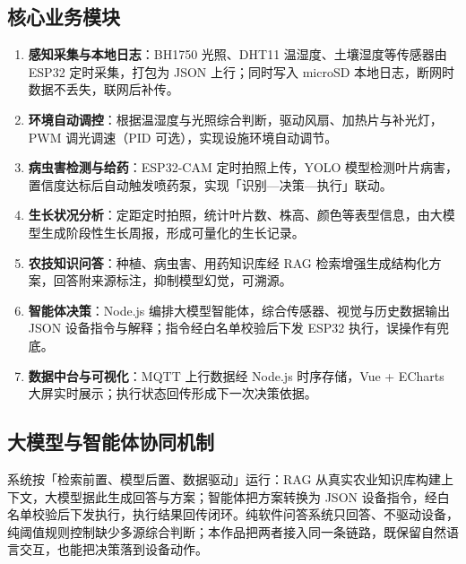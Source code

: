﻿\documentclass[11pt]{ctexart}
\begin{document}
\subsection{核心业务模块}
\begin{enumerate}
  \item \textbf{感知采集与本地日志}：BH1750 光照、DHT11 温湿度、土壤湿度等传感器由 ESP32 定时采集，打包为 JSON 上行；同时写入 microSD 本地日志，断网时数据不丢失，联网后补传。
  \item \textbf{环境自动调控}：根据温湿度与光照综合判断，驱动风扇、加热片与补光灯，PWM 调光调速（PID 可选），实现设施环境自动调节。
  \item \textbf{病虫害检测与给药}：ESP32-CAM 定时拍照上传，YOLO 模型检测叶片病害，置信度达标后自动触发喷药泵，实现「识别—决策—执行」联动。
  \item \textbf{生长状况分析}：定距定时拍照，统计叶片数、株高、颜色等表型信息，由大模型生成阶段性生长周报，形成可量化的生长记录。
  \item \textbf{农技知识问答}：种植、病虫害、用药知识库经 RAG 检索增强生成结构化方案，回答附来源标注，抑制模型幻觉，可溯源。
  \item \textbf{智能体决策}：Node.js 编排大模型智能体，综合传感器、视觉与历史数据输出 JSON 设备指令与解释；指令经白名单校验后下发 ESP32 执行，误操作有兜底。
  \item \textbf{数据中台与可视化}：MQTT 上行数据经 Node.js 时序存储，Vue + ECharts 大屏实时展示；执行状态回传形成下一次决策依据。
\end{enumerate}

\subsection{大模型与智能体协同机制}
系统按「检索前置、模型后置、数据驱动」运行：RAG 从真实农业知识库构建上下文，大模型据此生成回答与方案；智能体把方案转换为 JSON 设备指令，经白名单校验后下发执行，执行结果回传闭环。纯软件问答系统只回答、不驱动设备，纯阈值规则控制缺少多源综合判断；本作品把两者接入同一条链路，既保留自然语言交互，也能把决策落到设备动作。
\end{document}
